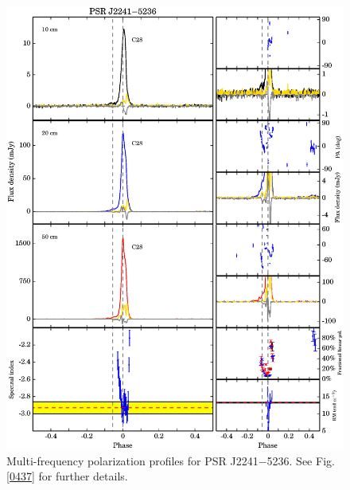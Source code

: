 \documentclass[useAMS,usenatbib]{mn2e}
\begin{document}
\begin{appendices}
\begin{figure}
\begin{center}
\includegraphics[width=6 in]{2241.ps}
\caption{Multi-frequency polarization profiles for PSR J2241$-$5236. 
See Fig. \ref{0437} for further details.}
\label{2241}
\end{center}
\end{figure}

\end{appendices}
\end{document}

